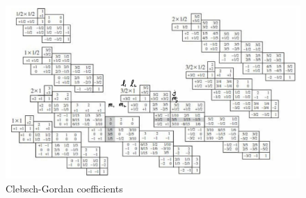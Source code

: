 \begin{figure}
    \centering
    \includegraphics[width=1\linewidth]{src/clebsch-gordan.jpeg}
    \caption{Clebsch-Gordan coefficients}
    \label{fig:cg_coef}
\end{figure}


